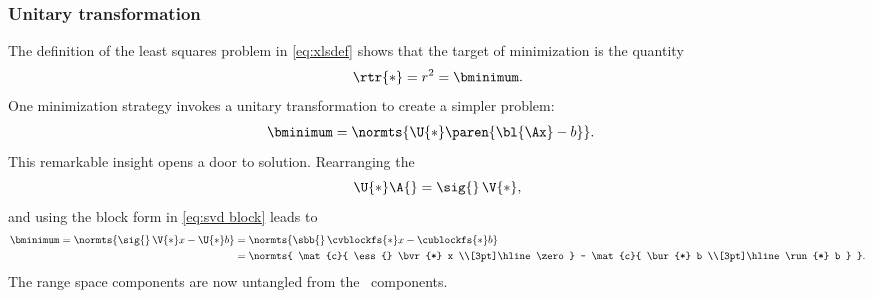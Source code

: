 \subsubsection{Unitary transformation}  %
The definition of the least squares problem in \eqref{eq:xlsdef} shows that the target of minimization is the quantity
\begin{equation*}
  \rtr{*} = r^{2} = \bminimum .
\end{equation*}
One minimization strategy invokes a unitary transformation to create a simpler problem:
\begin{equation}
  \begin{split} 
    \bminimum 
      &= \normts{ \U{*} \paren{ \bl{\Ax} - b }  }.
  \end{split} 
\end{equation}
This remarkable insight opens a door to solution. Rearranging the \asvd 
\begin{equation*}
  \U{*} \A{} = \sig{} \, \V{*},
\end{equation*}
and using the block form in \eqref{eq:svd block} leads to
\begin{equation*}
  \begin{split} 
    \bminimum 
        = \normts{ \sig{} \, \V{*} x - \U{*} b }
      & = \normts{ \sbb{} \, \cvblockfs{*} x - \cublockfs{*} b } \\
	  & = \normts{ \mat{c}{ \ess{} \bvr{*} x \\[3pt]\hline\zero  } - \mat{c}{ \bur{*} b \\[3pt]\hline \run{*} b } }.
  \end{split} 
\end{equation*}
The range space components are now untangled from the  \ns \ components.

